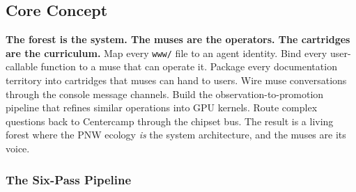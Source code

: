 \documentclass[11pt,letterpaper]{article}
\begin{document}
\subsection{Core Concept}

\begin{quotebox}
\textbf{The forest is the system. The muses are the operators. The cartridges are the curriculum.} Map every \texttt{www/} file to an agent identity. Bind every user-callable function to a muse that can operate it. Package every documentation territory into cartridges that muses can hand to users. Wire muse conversations through the console message channels. Build the observation-to-promotion pipeline that refines similar operations into GPU kernels. Route complex questions back to Centercamp through the chipset bus. The result is a living forest where the PNW ecology \emph{is} the system architecture, and the muses are its voice.
\end{quotebox}

\subsubsection{The Six-Pass Pipeline}
\end{document}
